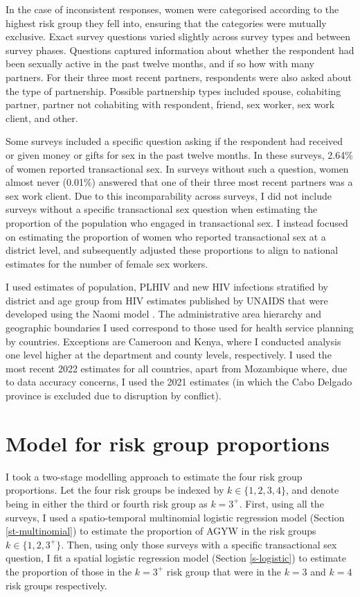 \documentclass[a4paper, nobind]{templates/ociamthesis}
\begin{document}
In the case of inconsistent responses, women were categorised according to the highest risk group they fell into, ensuring that the categories were mutually exclusive.
Exact survey questions varied slightly across survey types and between survey phases.
Questions captured information about whether the respondent had been sexually active in the past twelve months, and if so how with many partners.
For their three most recent partners, respondents were also asked about the type of partnership.
Possible partnership types included spouse, cohabiting partner, partner not cohabiting with respondent, friend, sex worker, sex work client, and other.

Some surveys included a specific question asking if the respondent had received or given money or gifts for sex in the past twelve months.
In these surveys, 2.64\% of women reported transactional sex.
In surveys without such a question, women almost never (0.01\%) answered that one of their three most recent partners was a sex work client.
Due to this incomparability across surveys, I did not include surveys without a specific transactional sex question when estimating the proportion of the population who engaged in transactional sex.
I instead focused on estimating the proportion of women who reported transactional sex at a district level, and subsequently adjusted these proportions to align to national estimates for the number of female sex workers.

I used estimates of population, PLHIV and new HIV infections stratified by district and age group from HIV estimates published by UNAIDS that were developed using the Naomi model \autocite{eaton2021naomi}.
The administrative area hierarchy and geographic boundaries I used correspond to those used for health service planning by countries.
Exceptions are Cameroon and Kenya, where I conducted analysis one level higher at the department and county levels, respectively.
I used the most recent 2022 estimates for all countries, apart from Mozambique where, due to data accuracy concerns, I used the 2021 estimates (in which the Cabo Delgado province is excluded due to disruption by conflict).

\hypertarget{model-for-risk-group-proportions}{%
\section{Model for risk group proportions}\label{model-for-risk-group-proportions}}

I took a two-stage modelling approach to estimate the four risk group proportions.
Let the four risk groups be indexed by \(k \in \{1, 2, 3, 4\}\), and denote being in either the third or fourth risk group as \(k = 3^{+}\).
First, using all the surveys, I used a spatio-temporal multinomial logistic regression model (Section \ref{st-multinomial}) to estimate the proportion of AGYW in the risk groups \(k \in \{1, 2, 3^{+}\}\).
Then, using only those surveys with a specific transactional sex question, I fit a spatial logistic regression model (Section \ref{s-logistic}) to estimate the proportion of those in the \(k = 3^{+}\) risk group that were in the \(k = 3\) and \(k = 4\) risk groups respectively.
\end{document}
